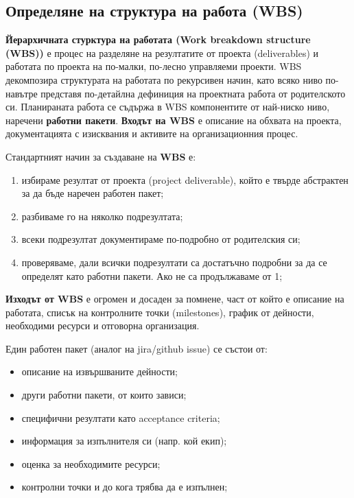 \documentclass[fleqn,12pt]{article}
\begin{document}
\subsection{Определяне на структура на работа (WBS)}

\textbf{Йерархичната стурктура на работата (Work breakdown structure (WBS))} е процес на разделяне на резултатите от проекта (deliverables) и работата по проекта на по-малки, по-лесно управляеми проекти.
WBS декомпозира структурата на работата по рекурсивен начин, като всяко ниво по-навътре представя по-детайлна дефиниция на проектната работа от родителското си.
Планираната работа се съдържа в WBS компонентите от най-ниско ниво, наречени \textbf{работни пакети}.
\bigbreak
\textbf{Входът на WBS} е описание на обхвата на проекта, документацията с изисквания и активите на организационния процес.
\bigbreak

Стандартният начин за създаване на \textbf{WBS} е:
\begin{enumerate}
    \item избираме резултат от проекта (project deliverable), който е твърде абстрактен за да бъде наречен работен пакет;
    \item разбиваме го на няколко подрезултата;
    \item всеки подрезултат документираме по-подробно от родителския си;
    \item проверяваме, дали всички подрезултати са достатъчно подробни за да се определят като работни пакети. Ако не са продължаваме от 1;
\end{enumerate}

\textbf{Изходът от WBS} е огромен и досаден за помнене, част от който е описание на работата, списък на контролните точки (milestones), график от дейности, необходими ресурси и отговорна организация.
\bigbreak

Един работен пакет (аналог на jira/github issue) се състои от:
\begin{itemize}
    \item описание на извършваните дейности;
    \item други работни пакети, от които зависи;
    \item специфични резултати като acceptance criteria;
    \item информация за изпълнителя си (напр. кой екип);
    \item оценка за необходимите ресурси;
    \item контролни точки и до кога трябва да е изпълнен;
\end{itemize}
\bigbreak
\end{document}
